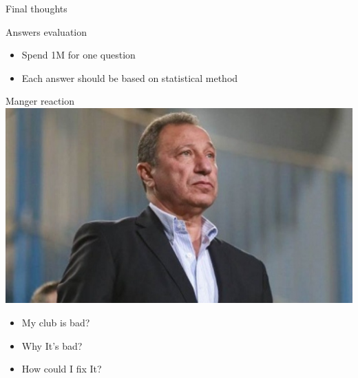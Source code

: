 \documentclass[8pt]{beamer}
\begin{document}
        \begin{frame}[t]{Final thoughts}
            \begin{block}{Answers evaluation}
                \begin{itemize}
                    \item Spend 1M for one question\pause
                    \item Each answer should be based on statistical method\pause
                \end{itemize}
            \end{block}

            \begin{block}{Manger reaction}
                \includegraphics[height=.33\textheight]{pics/manger.jpg}\pause
                \begin{itemize}
                    \item My club is bad?\pause
                    \item Why It's bad?\pause
                    \item How could I fix It?
                \end{itemize}
            \end{block}
        \end{frame}
    
\end{document}

